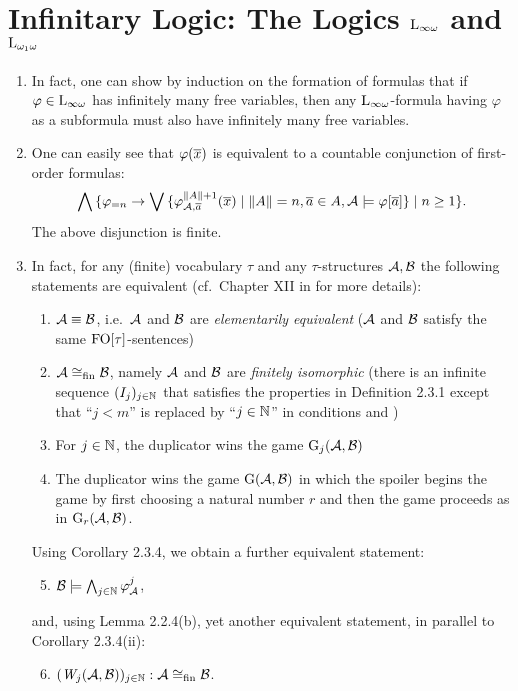 \section{Infinitary Logic: The Logics $\inflog{\infty}$ and $\inflog{\omega_1}$}
\begin{enumerate}[1.]
%
\item {} In fact, one can show by induction on the formation of formulas that if $\varphi \in \inflog{\infty}$ has infinitely many free variables, then any $\inflog{\infty}$-formula having $\varphi$ as a subformula must also have infinitely many free variables.
%
\item {} One can easily see that $\varphi(\overline{x})$ is equivalent to a countable conjunction of first-order formulas:
\[
\bigwedge {\{\varphi_{= n} \rightarrow\bigvee{\{\varphi^{\|A\| + 1}_{\mathcal{A}, \overline{a}}(\overline{x}) \mid \|A\| = n, \overline{a} \in A, \mathcal{A} \models\varphi[\overline{a}]\}} \mid n \geq 1\}}.
\]
The above disjunction is finite.
%
\item {} In fact, for any (finite) vocabulary $\tau$ and any $\tau$-structures $\mathcal{A}, \mathcal{B}$ the following statements are equivalent (cf.\ Chapter XII in \cite{EFT} for more details):
\begin{enumerate}[(1)]
\item $\strct{A} \equv \strct{B}$, i.e.\ $\mathcal{A}$ and $\mathcal{B}$ are \emph{elementarily equivalent} ($\mathcal{A}$ and $\mathcal{B}$ satisfy the same $\folog\of{\tau}$-sentences)
\item $\strct{A} \isom_\fin \strct{B}$, namely $\mathcal{A}$ and $\mathcal{B}$ are \emph{finitely isomorphic} (there is an infinite sequence $(I_j)_{j \in \mathbb{N}}$ that satisfies the properties  in Definition 2.3.1 except that ``$j < m$'' is replaced by ``$j \in \mathbb{N}$'' in conditions  and )
\item For $j \in \mathbb{N}$, the duplicator wins the game $\game{j}(\strct{A}, \strct{B})$
\item The duplicator wins the game $\mathrm{G}(\mathcal{A}, \mathcal{B})$ in which the spoiler begins the game by first choosing a natural number $r$ and then the game proceeds as in $\game{r}(\strct{A}, \strct{B})$.
\end{enumerate}
Using Corollary 2.3.4, we obtain a further equivalent statement:
\begin{enumerate}[(1)]
\setcounter{enumii}{4}
\item $\mathcal{B} \models \bigwedge_{j \in \mathbb{N}} \varphi^{j}_{\mathcal{A}}$,
\end{enumerate}
and, using Lemma 2.2.4(b), yet another equivalent statement, in parallel to Corollary 2.3.4(ii):
\begin{enumerate}[(1)]
\setcounter{enumii}{5}
\item $\seq{\winpos{j}(\strct{A}, \strct{B})}{j \in \nat} : \strct{A} \isom_\fin \strct{B}$.
\end{enumerate}


\end{enumerate}

